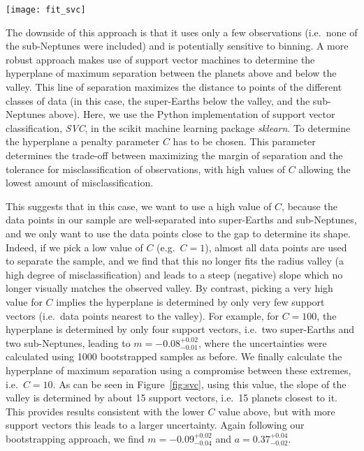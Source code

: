 \documentclass[a4paper,fleqn,usenatbib]{mnras}
\begin{document}
\begin{figure*}
	\texttt{[image: fit\_svc]}
	\caption{The slope of the radius valley as determined by support vector machines. The grey line represents the hyperplane of maximum separation, together with a 68\% confidence interval derived from bootstrapping the original sample. The super-Earths below the radius valley are shown in red, while the sub-Neptunes above the valley are plotted in blue. The encircled data points are the support vectors, which determine the slope of the radius valley. The parallel dotted lines go through the support vectors, and are determined by offsets $a_\mathrm{low} = 0.29^{+0.04}_{-0.03}$ and $a_\mathrm{upp} = 0.44^{0.04}_{-0.03}$ respectively.}
	\label{fig:svc}
\end{figure*}


The downside of this approach is that it uses only a few observations (i.e.\ none of the sub-Neptunes were included) and is potentially sensitive to binning. A more robust approach makes use of support vector machines to determine the hyperplane of maximum separation between the planets above and below the valley. This line of separation maximizes the distance to points of the different classes of data (in this case, the super-Earths below the valley, and the sub-Neptunes above). Here, we use the Python implementation of support vector classification, \textit{SVC}, in the scikit machine learning package \textit{sklearn}. To determine the hyperplane a penalty parameter $C$ has to be chosen. This parameter determines the trade-off between maximizing the margin of separation and the tolerance for misclassification of observations, with high values of $C$ allowing the lowest amount of misclassification. 

This suggests that in this case, we want to use a high value of $C$, because the data points in our sample are well-separated into super-Earths and sub-Neptunes, and we only want to use the data points close to the gap to determine its shape. Indeed, if we pick a low value of $C$ (e.g.\ $C=1$), almost all data points are used to separate the sample, and we find that this no longer fits the radius valley (a high degree of misclassification) and leads to a steep (negative) slope which no longer visually matches the observed valley. By contrast, picking a very high value for $C$ implies the hyperplane is determined by only very few support vectors (i.e.\ data points nearest to the valley). For example, for $C=100$, the hyperplane is determined by only four support vectors, i.e.\ two super-Earths and two sub-Neptunes, leading to $m = -0.08^{+0.02}_{-0.01}$, where the uncertainties were calculated using 1000 bootstrapped samples as before. We finally calculate the hyperplane of maximum separation using a compromise between these extremes, i.e.\ $C=10$. As can be seen in Figure~\ref{fig:svc}, using this value, the slope of the valley is determined by about 15 support vectors, i.e.\ 15 planets closest to it. This provides results consistent with the lower $C$ value above, but with more support vectors this leads to a larger uncertainty. Again following our bootstrapping approach, we find $m = -0.09^{+0.02}_{-0.04}$ and $a = 0.37^{+0.04}_{-0.02}$.  
\end{document}
